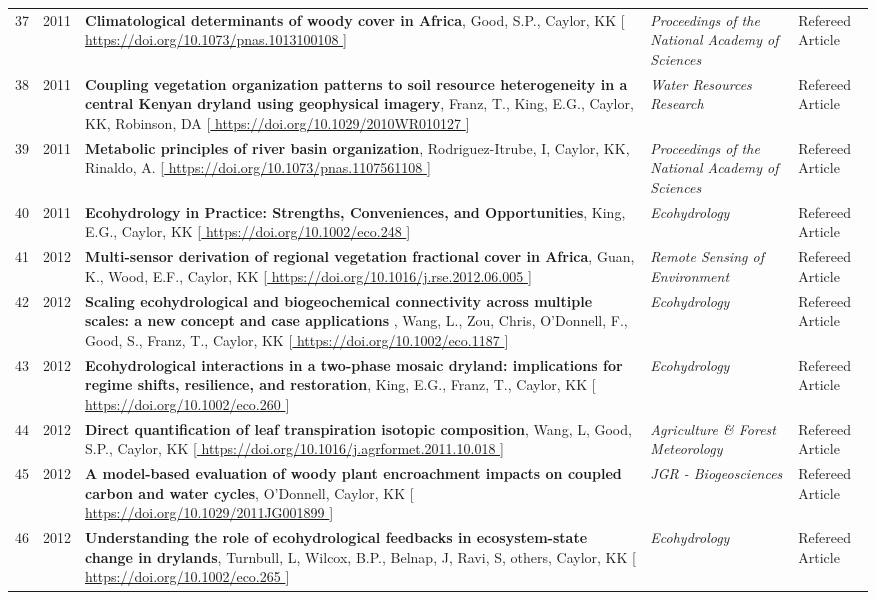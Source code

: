 \begin{supertabular}{lcp{8.25cm}p{4.75cm}p{1.75cm}}
37 & 2011 & {\bf Climatological determinants of woody cover in Africa}, Good, S.P., Caylor, KK [\url{ https://doi.org/10.1073/pnas.1013100108 }] & \emph{ Proceedings of the National Academy of Sciences } & Refereed Article\\
38 & 2011 & {\bf Coupling vegetation organization patterns to soil resource heterogeneity in a central Kenyan dryland using geophysical imagery}, Franz, T., King, E.G., Caylor, KK, Robinson, DA [\url{ https://doi.org/10.1029/2010WR010127 }] & \emph{ Water Resources Research } & Refereed Article\\
39 & 2011 & {\bf Metabolic principles of river basin organization}, Rodriguez-Itrube, I, Caylor, KK, Rinaldo, A. [\url{ https://doi.org/10.1073/pnas.1107561108 }] & \emph{ Proceedings of the National Academy of Sciences } & Refereed Article\\
40 & 2011 & {\bf Ecohydrology in Practice: Strengths, Conveniences, and Opportunities}, King, E.G., Caylor, KK [\url{ https://doi.org/10.1002/eco.248 }] & \emph{ Ecohydrology } & Refereed Article\\
41 & 2012 & {\bf Multi-sensor derivation of regional vegetation fractional cover in Africa}, Guan, K., Wood, E.F., Caylor, KK [\url{ https://doi.org/10.1016/j.rse.2012.06.005 }] & \emph{ Remote Sensing of Environment } & Refereed Article\\
42 & 2012 & {\bf Scaling ecohydrological and biogeochemical connectivity across multiple scales: a new concept and case applications
}, Wang, L., Zou, Chris, O'Donnell, F., Good, S., Franz, T., Caylor, KK [\url{ https://doi.org/10.1002/eco.1187 }] & \emph{ Ecohydrology } & Refereed Article\\
43 & 2012 & {\bf Ecohydrological interactions in a two-phase mosaic dryland: implications for regime shifts, resilience, and restoration}, King, E.G., Franz, T., Caylor, KK [\url{ https://doi.org/10.1002/eco.260 }] & \emph{ Ecohydrology } & Refereed Article\\
44 & 2012 & {\bf Direct quantification of leaf transpiration isotopic composition}, Wang, L, Good, S.P., Caylor, KK [\url{ https://doi.org/10.1016/j.agrformet.2011.10.018 }] & \emph{ Agriculture \& Forest Meteorology } & Refereed Article\\
45 & 2012 & {\bf A model-based evaluation of woody plant encroachment impacts on coupled carbon and water cycles}, O'Donnell, Caylor, KK [\url{ https://doi.org/10.1029/2011JG001899 }] & \emph{ JGR - Biogeosciences } & Refereed Article\\
46 & 2012 & {\bf Understanding the role of ecohydrological feedbacks in ecosystem-state change in drylands}, Turnbull, L, Wilcox, B.P., Belnap, J, Ravi, S, others, Caylor, KK [\url{ https://doi.org/10.1002/eco.265 }] & \emph{ Ecohydrology } & Refereed Article\\

\end{supertabular}
